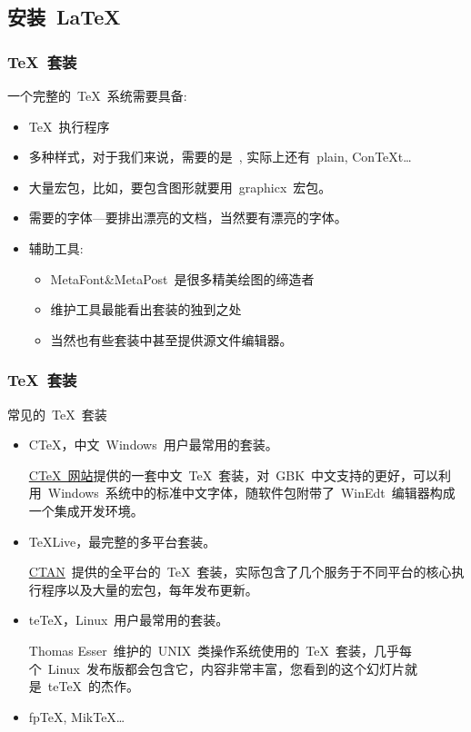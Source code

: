 \subsection{安装~\LaTeX}
\begin{frame}
    \frametitle{\TeX~套装}
    \begin{block}{一个完整的~\TeX~系统需要具备:}
	\begin{itemize}
	    \item<2-> \TeX~执行程序
	    \item<3-> 多种样式，对于我们来说，需要的是~\LaTeXe, 实际上还有~plain, Con\TeX{}t\ldots
	    \item<4-> 大量宏包，比如，要包含图形就要用~graphicx~宏包。
	    \item<5-> 需要的字体---要排出漂亮的文档，当然要有漂亮的字体。
	    \item<6-> 辅助工具:
		\begin{itemize}
		    \item \alert<7->{MetaFont\&MetaPost}~是很多精美绘图的缔造者
		    \item \alert<8->{维护工具}最能看出套装的独到之处
		    \item 当然也有些套装中甚至提供源文件\alert<9->{编辑器}。
		\end{itemize}
	\end{itemize}
    \end{block}
\end{frame}
\begin{frame}
    \frametitle{\TeX~套装}
    \begin{block}{常见的~\TeX~套装}
	\begin{itemize}
	    \item<1-| alert@2> C\TeX，中文~Windows~用户最常用的套装。

		\href{http://www.ctex.org}{CTeX~网站}提供的一套中文~TeX~套装，对~GBK~中文支持的更好，可以利用~Windows~系统中的标准中文字体，随软件包附带了~WinEdt~编辑器构成一个集成开发环境。
	    \item<1-| alert@3> \TeX{}Live，最完整的多平台套装。

		\href{http://www.ctan.org}{CTAN}~提供的全平台的~TeX~套装，实际包含了几个服务于不同平台的核心执行程序以及大量的宏包，每年发布更新。
		
	    \item<1-| alert@4> te\TeX，Linux~用户最常用的套装。

		 Thomas Esser~维护的~UNIX~类操作系统使用的~\TeX~套装，几乎每个~Linux~发布版都会包含它，内容非常丰富，您看到的这个幻灯片就是~te\TeX~的杰作。

	    \item<1-> fp\TeX, Mik\TeX\ldots
	\end{itemize}
    \end{block}
\end{frame}

